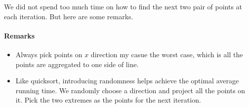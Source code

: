 We did not spend too much time on how to find the next two pair of points at 
each iteration. But here are some remarks.

\paragraph{Remarks}
\begin{itemize}
 \item Always pick points on $x$ direction my casue the worst case, which is 
all the points are aggregated to one side of line.
\item Like quicksort, introducing randomness helps achieve the optimal average 
running time. We randomly choose a direction and project all the points on it. 
Pick the two extremes as the points for the next iteration.
\end{itemize}